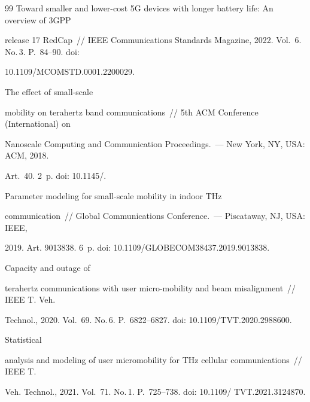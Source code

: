 {{\begin{thebibliography}{99}
Toward smaller and lower-cost 5G devices with longer battery life: An overview of 3GPP 


release 17 RedCap~/\!\!/  IEEE Communications Standards Magazine, 2022. Vol.~6. No.\,3. P.~84--90. doi: 


10.1109\!/\!MCOMSTD.0001.2200029.







 The effect of small-scale 


mobility on terahertz band communications~/\!\!/  5th ACM Conference (International) on 


Nanoscale Computing and Communication Proceedings.~--- New York, NY, USA: ACM, 2018. 


Art.~40. 2~p. doi: 10.1145\!/.







 Parameter modeling for small-scale mobility in indoor THz 


communication~/\!\!/  Global Communications Conference.~--- Piscataway, NJ, USA: IEEE, 


2019. Art. 9013838. 6~p. doi: 10.1109\!/\!GLOBECOM38437.2019.9013838. 







 Capacity and outage of 


terahertz communications with user micro-mobility and beam misalignment~/\!\!/  IEEE T. Veh. 


Technol., 2020. Vol.~69. No.\,6. P.~6822--6827. doi: 10.1109\!/\!TVT.2020.2988600.




 Statistical 


analysis and modeling of user micromobility for THz cellular communications~/\!\!/  IEEE T. 


Veh. Technol., 2021. Vol.~71. No.\,1. P.~725--738. doi: 10.1109\!/ TVT.2021.3124870.












\end{thebibliography}}}
